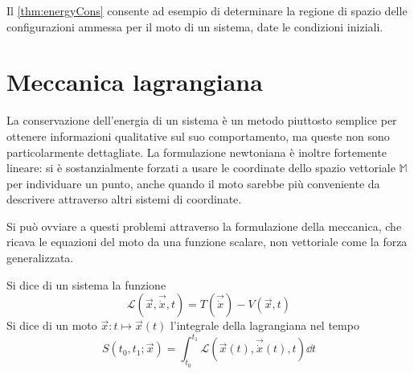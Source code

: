 Il \autoref{thm:energyCons} consente ad esempio di determinare la regione di spazio delle configurazioni ammessa per il moto di un sistema, date le condizioni iniziali.

\section{Meccanica lagrangiana}
La conservazione dell'energia di un sistema è un metodo piuttosto semplice per ottenere informazioni qualitative sul suo comportamento, ma queste non sono particolarmente dettagliate. La formulazione newtoniana è inoltre fortemente lineare: si è sostanzialmente forzati a usare le coordinate dello spazio vettoriale $\mathbb{M}$ per individuare un punto, anche quando il moto sarebbe più conveniente da descrivere attraverso altri sistemi di coordinate.

Si può ovviare a questi problemi attraverso la formulazione  della meccanica, che ricava le equazioni del moto da una funzione scalare, non vettoriale come la forza generalizzata.

\begin{definition}
  Si dice  di un sistema la funzione \begin{equation}
  \mathcal{L}(\vec{x},\vec{\dot{x}},t) = T(\vec{\dot{x}}) - V(\vec{x},t)
  \end{equation} 
  Si dice  di un moto $\vec{x}:t\mapsto \vec{x}(t)$ l'integrale della lagrangiana nel tempo \begin{equation} \label{eq:action}
  S(t_0,t_1; \vec{x}) = \int_{t_0}^{t_1} \mathcal{L}(\vec{x}(t),\vec{\dot{x}}(t),t) \dd{t}
  \end{equation}
\end{definition}

